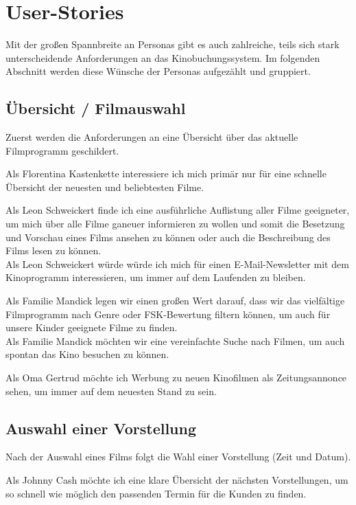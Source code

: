 \section{User-Stories}
\chaptermulitpleauthor{\authorGP}{\authorRF, \authorEJ}

Mit der großen Spannbreite an Personas gibt es auch zahlreiche, teils sich stark unterscheidende Anforderungen an das Kinobuchungssystem.
Im folgenden Abschnitt werden diese Wünsche der Personas aufgezählt und gruppiert.

\subsection{Übersicht / Filmauswahl}
Zuerst werden die Anforderungen an eine Übersicht über das aktuelle Filmprogramm geschildert.

Als Florentina Kastenkette interessiere ich mich primär nur für eine schnelle Übersicht der neuesten und beliebtesten Filme.

Als Leon Schweickert finde ich eine ausführliche Auflistung aller Filme geeigneter, um mich über alle Filme ganeuer informieren zu wollen und somit die Besetzung und Vorschau eines Films ansehen zu können oder auch die Beschreibung des Films lesen zu können.
\\
Als Leon Schweickert würde würde ich mich für einen E-Mail-Newsletter mit dem Kinoprogramm interessieren, um immer auf dem Laufenden zu bleiben.

Als Familie Mandick legen wir einen großen Wert darauf, dass wir das vielfältige Filmprogramm nach Genre oder \acs{FSK}-Bewertung filtern können, um auch für unsere Kinder geeignete Filme zu finden.
\\
Als Familie Mandick möchten wir eine vereinfachte Suche nach Filmen, um auch spontan das Kino besuchen zu können.

Als Oma Gertrud möchte ich Werbung zu neuen Kinofilmen als Zeitungsan­non­ce sehen, um immer auf dem neuesten Stand zu sein.

\subsection{Auswahl einer Vorstellung}
Nach der Auswahl eines Films folgt die Wahl einer Vorstellung (Zeit und Datum).

Als Johnny Cash möchte ich eine klare Übersicht der nächsten Vorstellungen, um so schnell wie möglich den passenden Termin für die Kunden zu finden.

